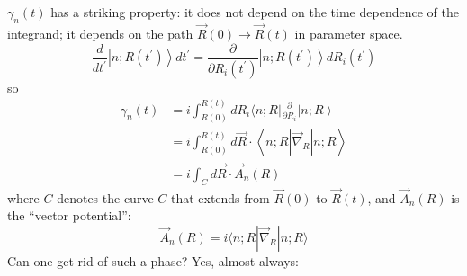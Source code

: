 \documentclass[12pt]{article}
\newcommand{\be}{\begin{equation}}
\newcommand{\ee}{\end{equation}}
\begin{document}
$\gamma_{n}(t)$ has a striking property: it does not depend
on the time dependence of the integrand; it depends 
on the path $\vec{R}(0) \to \vec{R}(t)$  in parameter space.
\be
\frac{d}{d t^{\prime}}\left|n ; R\left(t^{\prime}\right)\right\rangle d t^{\prime}=\frac{\partial}{\partial R_{i}\left(t^{\prime}\right)}\left|n ; R\left(t^{\prime}\right)\right\rangle d R_{i}\left(t^{\prime}\right)
\ee
so
\begin{align}
\gamma_{n}(t)
&=i \int_{R(0)}^{R(t)} d R_{i}\langle n ; R| \frac{\partial}{\partial R_{i}}\left|n ; R\right\rangle\nonumber\\
&=i \int_{R(0)}^{R(t)} d \vec{R} \cdot\left\langle n ; R\left|\vec{\nabla}_{\!R}\right| n ; R\right\rangle\\
&=i \int_{C} d \vec{R} \cdot \vec{A}_{n}(R)
\end{align}
where $C$ denotes the curve $C$ that extends from
$\vec{R}(0)$ to $\vec{R}(t)$, and $\vec{A}_{n}(R)$ is the ``vector
potential'':
\be
\vec{A}_{n}(R)=i\langle n ; R|\vec{\nabla}_{\!R}| n ; R\rangle
\label{eq:g118}
\ee
Can one get rid of such a phase? Yes, almost always:
\end{document}
